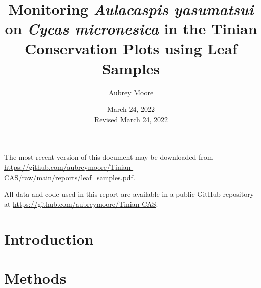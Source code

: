 \documentclass[12pt,letterpaper,english,bibliography=totocnumbered, abstract=on]{scrartcl}
\begin{document}
\titlehead{Technical Report}

\title{Monitoring \textit{Aulacaspis yasumatsui} on \textit{Cycas micronesica} in the Tinian Conservation Plots using Leaf Samples}

\author{Aubrey Moore}

\date{March 24, 2022\\Revised March 24, 2022}

\maketitle
\newpage
\tableofcontents

\pagebreak

The most recent version of this document may be downloaded from \url{https://github.com/aubreymoore/Tinian-CAS/raw/main/reports/leaf_samples.pdf}.

All data and code used in this report are available in a public GitHub repository at
\url{https://github.com/aubreymoore/Tinian-CAS}.

\section{Introduction}





\clearpage
\section{Methods}
\end{document}

